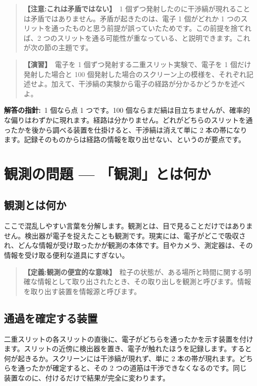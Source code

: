 \documentclass{article}
\begin{document}
\begin{quote}
\textbf{【注意:これは矛盾ではない】}\ 1 個ずつ発射したのに干渉縞が現れることは矛盾ではありません。矛盾が起きたのは、電子 1 個がどれか 1 つのスリットを通ったものと思う前提が誤っていたためです。この前提を捨てれば、2 つのスリットを通る可能性が重なっている、と説明できます。これが次の節の主題です。
\end{quote}

\begin{quote}
\textbf{【演習】}\ 電子を 1 個ずつ発射する二重スリット実験で、電子を 1 個だけ発射した場合と 100 個発射した場合のスクリーン上の模様を、それぞれ記述せよ。加えて、干渉縞の実験から電子の経路が分かるかどうかを述べよ。
\end{quote}

\textbf{解答の指針:}\ 1 個なら点 1 つです。100 個ならまだ縞は目立ちませんが、確率的な偏りはわずかに現れます。経路は分かりません。どれがどちらのスリットを通ったかを後から調べる装置を仕掛けると、干渉縞は消えて単に 2 本の帯になります。記録そのものからは経路の情報を取り出せない、というのが要点です。

\section{観測の問題 — 「観測」とは何か}

\subsection{観測とは何か}

ここで混乱しやすい言葉を分解します。観測とは、目で見ることだけではありません。検出器が電子を捉えたことも観測です。現実には、電子がどこで吸収され、どんな情報が受け取ったかが観測の本体です。目やカメラ、測定器は、その情報を受け取る便利な道具にすぎない。

\begin{quote}
\textbf{【定義:観測の便宜的な意味】}\ 粒子の状態が、ある場所と時間に関する明確な情報として取り出されたとき、その取り出しを観測と呼びます。情報を取り出す装置を情報源と呼びます。
\end{quote}

\subsection{通過を確定する装置}

二重スリットの各スリットの直後に、電子がどちらを通ったかを示す装置を付けます。スリットの近傍に検出器を置き、電子が触れたほうを記録します。すると何が起きるか。スクリーンには干渉縞が現れず、単に 2 本の帯が現れます。どちらを通ったかが確定すると、その 2 つの道筋は干渉できなくなるのです。同じ装置なのに、付けるだけで結果が完全に変わります。
\end{document}
